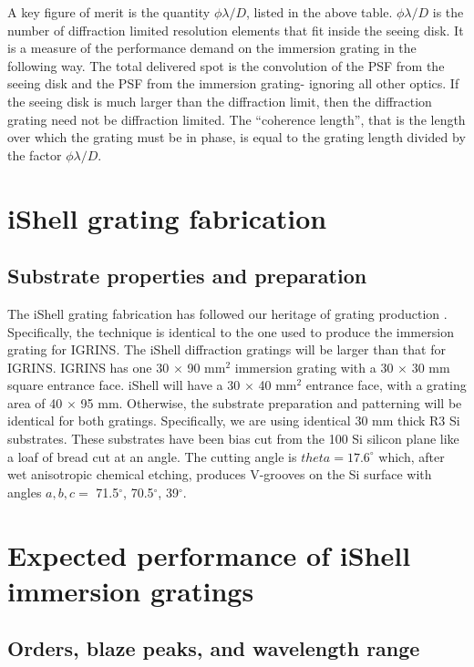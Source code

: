 A key figure of merit is the quantity $\phi \lambda/D$, listed in the above table.  $\phi \lambda/D$ is the number of diffraction limited resolution elements that fit inside the seeing disk.  It is a measure of the performance demand on the immersion grating in the following way.  The total delivered spot is the convolution of the PSF from the seeing disk and the PSF from the immersion grating- ignoring all other optics.  If the seeing disk is much larger than the diffraction limit, then the diffraction grating need not be diffraction limited.  The ``coherence length'', that is the length over which the grating must be in phase, is equal to the grating length divided by the factor $\phi \lambda/D$.


\section{iShell grating fabrication}

\subsection{Substrate properties and preparation}
The iShell grating fabrication has followed our heritage of grating production \cite{2010SPIE.7739E.146W}.  Specifically, the technique is identical to the one used to produce the immersion grating for IGRINS.  The iShell diffraction gratings will be larger than that for IGRINS.  IGRINS has one 30 $\times$ 90 mm$^2$ immersion grating with a 30 $\times$ 30 mm square entrance face.  iShell will have a 30 $\times$ 40 mm$^2$ entrance face, with a grating area of 40 $\times$ 95 mm.  Otherwise, the substrate preparation and patterning will be identical for both gratings.  Specifically, we are using identical 30 mm thick R3 Si substrates.  These substrates have been bias cut from the 100 Si silicon plane like a loaf of bread cut at an angle.  The cutting angle is $theta=17.6^\circ$ which, after wet anisotropic chemical etching, produces V-grooves on the Si surface with angles $a, b, c =$ 71.5$^\circ$, 70.5$^\circ$, 39$^\circ$.

\section{Expected performance of iShell immersion gratings}


\subsection{Orders, blaze peaks, and wavelength range}

